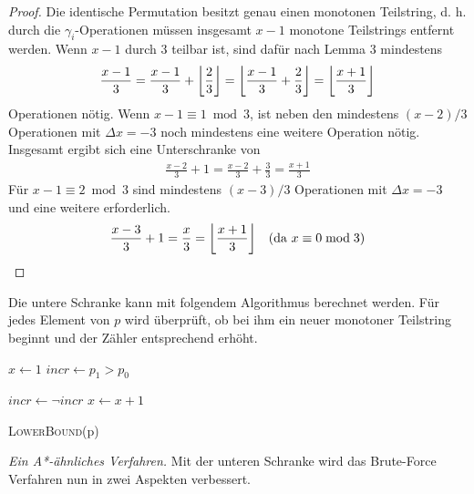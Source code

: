 \documentclass[a4paper, 11pt, ngerman]{article}
\begin{document}
\begin{proof}
    Die identische Permutation besitzt genau einen monotonen Teilstring, d. h. durch die $\gamma_i$-Operationen müssen insgesamt $x - 1$ monotone Teilstrings entfernt werden. Wenn $x - 1$ durch 3 teilbar ist, sind dafür nach Lemma 3 mindestens
    \begin{align*}
        \frac {x - 1} 3 = \frac {x - 1} 3 + \bigg{\lfloor} \frac 2 3 \bigg{\rfloor}
        = \bigg{\lfloor} \frac {x - 1} 3 + \frac 2 3 \bigg{\rfloor} =
        \bigg{\lfloor} \frac {x + 1} 3 \bigg{\rfloor}
    \end{align*}
    Operationen nötig. Wenn $x - 1 \equiv 1 \bmod 3$, ist neben den mindestens $(x - 2)/3$ Operationen mit $\Delta x = -3$ noch mindestens eine weitere Operation nötig. Insgesamt ergibt sich eine Unterschranke von
    \begin{align*}
        \frac {x - 2} 3 + 1 = \frac {x - 2} 3 + \frac 3 3 = \frac {x + 1} 3
    \end{align*}
    Für $x - 1 \equiv 2 \bmod 3$ sind mindestens $(x - 3) / 3$ Operationen mit $\Delta x = -3$ und eine weitere erforderlich.
    \begin{align*}
        \frac {x - 3} 3 + 1 = \frac x 3 = \bigg{\lfloor} \frac {x + 1} 3 \bigg{\rfloor} \quad (\text{da } x \equiv 0 \bmod 3)
    \end{align*}
\end{proof}

Die untere Schranke kann mit folgendem Algorithmus berechnet werden. Für jedes Element von $p$ wird überprüft, ob bei ihm ein neuer monotoner Teilstring beginnt und der Zähler entsprechend erhöht.

\begin{algorithm}
    {
    }

    $x \gets 1$ \;
    $incr \gets p_1 > p_0$ \;

    {
        {
            $incr \gets \neg incr$ \;
            $x \gets x + 1$ \;
        }
    }


    \caption{\textsc{LowerBound}(p)}
\end{algorithm}

\noindent \emph{Ein A*-ähnliches Verfahren.} Mit der unteren Schranke wird das Brute-Force Verfahren nun in zwei Aspekten verbessert.
\end{document}

